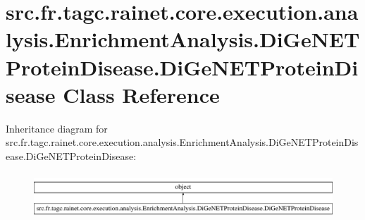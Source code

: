 \hypertarget{classsrc_1_1fr_1_1tagc_1_1rainet_1_1core_1_1execution_1_1analysis_1_1EnrichmentAnalysis_1_1DiGeNfa669edf4ec9ad533f4e4738eca5d84d}{\section{src.\-fr.\-tagc.\-rainet.\-core.\-execution.\-analysis.\-Enrichment\-Analysis.\-Di\-Ge\-N\-E\-T\-Protein\-Disease.\-Di\-Ge\-N\-E\-T\-Protein\-Disease Class Reference}
\label{classsrc_1_1fr_1_1tagc_1_1rainet_1_1core_1_1execution_1_1analysis_1_1EnrichmentAnalysis_1_1DiGeNfa669edf4ec9ad533f4e4738eca5d84d}
}
Inheritance diagram for src.\-fr.\-tagc.\-rainet.\-core.\-execution.\-analysis.\-Enrichment\-Analysis.\-Di\-Ge\-N\-E\-T\-Protein\-Disease.\-Di\-Ge\-N\-E\-T\-Protein\-Disease\-:\begin{figure}[H]
\begin{center}
\leavevmode
\includegraphics[height=1.723077cm]{classsrc_1_1fr_1_1tagc_1_1rainet_1_1core_1_1execution_1_1analysis_1_1EnrichmentAnalysis_1_1DiGeNfa669edf4ec9ad533f4e4738eca5d84d}
\end{center}
\end{figure}

